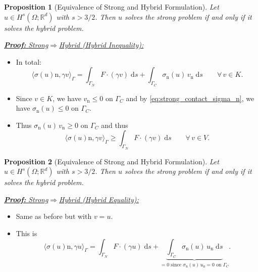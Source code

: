 \documentclass[10pt,aspectratio=169]{beamer}
\newtheorem{proposition}{Proposition}[section]
\def\R{{\mathbb R}}
\def\d{{\mathrm{d}}}
\def\ds{{\d s}}
\begin{document}
\begin{frame}
	\begin{proposition}[Equivalence of Strong and Hybrid Formulation]
		Let $u\in H^s(\Omega;\R^d)$ with $s>3/2$. Then $u$ solves the strong problem if and only if it solves the hybrid problem.
	\end{proposition}
	\underline{\textbf{\em Proof:} {\em Strong\enspace}$\Longrightarrow${\em\enspace Hybrid (Hybrid Inequality):}}
	\begin{itemize}
		\item In total:
		      \begin{equation*}
			      \langle \sigma(u)\mathrm n,\gamma v\rangle_\Gamma
			      = \int_{\Gamma_N}F\cdot(\gamma v)\;\ds + \int_{\Gamma_C} \sigma_\mathrm{n}(u)\, v_\mathrm{n}\;\ds\qquad \forall\, v\in K.
		      \end{equation*}
		\item Since $v\in K$, we have $v_\mathrm{n}\le 0$ on $\Gamma_C$ and by \eqref{eq:strong_contact_sigma_n}, we have $\sigma_\mathrm{n}(u)\le 0$ on $\Gamma_C$.
		\item Thus $\sigma_\mathrm{n}(u)\, v_\mathrm{n}\ge 0$ on $\Gamma_C$ and thus
		      \begin{equation*}
			      \langle \sigma(u)\mathrm n,\gamma v\rangle_\Gamma
			      \ge \int_{\Gamma_N}F\cdot(\gamma v)\;\ds\qquad \forall\, v\in V.
		      \end{equation*}
	\end{itemize}
\end{frame}

\begin{frame}
	\begin{proposition}[Equivalence of Strong and Hybrid Formulation]
		Let $u\in H^s(\Omega;\R^d)$ with $s>3/2$. Then $u$ solves the strong problem if and only if it solves the hybrid problem.
	\end{proposition}
	\underline{\textbf{\em Proof:} {\em Strong\enspace}$\Longrightarrow${\em\enspace Hybrid (Hybrid Equality):}}
	\begin{itemize}
		\item Same as before but with $v = u$.
		\item This is
		      \begin{equation*}
			      \langle \sigma(u)\mathrm n,\gamma u\rangle_\Gamma
			      = \int_{\Gamma_N}F\cdot(\gamma u)\;\ds + \underbrace{\int_{\Gamma_C} \sigma_\mathrm{n}(u)\, u_\mathrm{n}\;\ds}_{=0\text{ since }\sigma_\mathrm{n}(u)\, u_\mathrm{n}=0\text{ on }\Gamma_C}.
		      \end{equation*}
	\end{itemize}
\end{frame}
\end{document}
